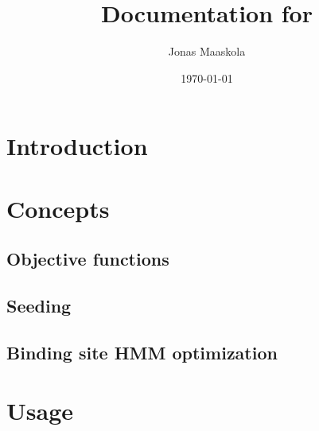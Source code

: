 \documentclass[a4paper]{article}
\title{Documentation for \dlhmm}
\author{Jonas Maaskola}
\date{\today}
\begin{document}
\maketitle

\begin{abstract}
\end{abstract}

\tableofcontents

\section{Introduction}

\section{Concepts}
\subsection{Objective functions}
\subsection{Seeding}
\subsection{Binding site HMM optimization}

\section{Usage}
\end{document}
